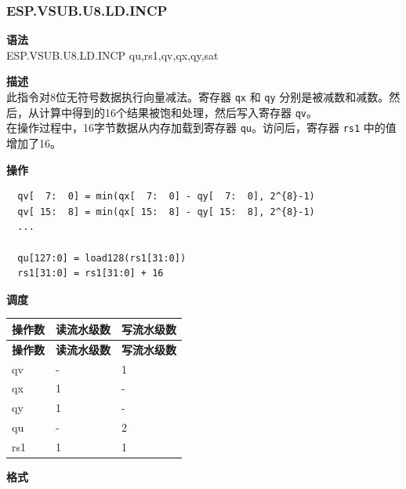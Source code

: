 \newpage

\newpage
\subsubsection{ESP.VSUB.U8.LD.INCP}\label{instruction:ESPVSUBU8LDINCP}
\textbf{语法}\\
ESP.VSUB.U8.LD.INCP qu,rs1,qv,qx,qy,sat

\textbf{描述}\\
此指令对8位无符号数据执行向量减法。寄存器 \lstinline{qx} 和 \lstinline{qy} 分别是被减数和减数。然后，从计算中得到的16个结果被饱和处理，然后写入寄存器 \lstinline{qv}。\\ 在操作过程中，16字节数据从内存加载到寄存器 \lstinline{qu}。访问后，寄存器 \lstinline{rs1} 中的值增加了16。

\textbf{操作}\\
\begin{lstlisting}
  qv[  7:  0] = min(qx[  7:  0] - qy[  7:  0], 2^{8}-1)
  qv[ 15:  8] = min(qx[ 15:  8] - qy[ 15:  8], 2^{8}-1)
  ...

  qu[127:0] = load128(rs1[31:0])
  rs1[31:0] = rs1[31:0] + 16
\end{lstlisting}

\textbf{调度}\\
\begin{longtable}[c]{|l|l|l|}
    \hline
    \rowcolor{lightgray}
    \textbf{操作数} & \textbf{读流水级数} & \textbf{写流水级数} \\\hline
    \endfirsthead
    \hline
    \rowcolor{lightgray}
     \textbf{操作数} & \textbf{读流水级数} & \textbf{写流水级数} \\\hline
    \endhead
    \hline
    \endfoot

  qv & - & 1 \\\hline
    qx & 1 & - \\\hline
    qy & 1 & - \\\hline
    qu & - & 2 \\\hline
    rs1 & 1 & 1

\end{longtable}

\textbf{格式}\\

